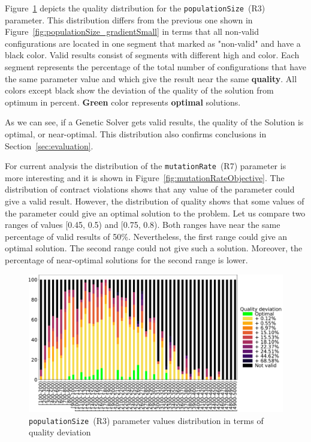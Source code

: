 Figure~\ref{fig:populationSizeObjective} depicts the quality distribution for the \texttt{populationSize}~(R3) parameter. This distribution differs from the previous one shown in Figure~\ref{fig:populationSize_gradientSmall} in terms that all non-valid configurations are located in one segment that marked as "non-valid" and have a black color. Valid results consist of segments with different high and color. Each segment represents the percentage of the total number of configurations that have the same parameter value and which give the result near the same \textbf{quality}. All colors except black show the deviation of the quality of the solution from optimum in percent. \textbf{Green} color represents \textbf{optimal} solutions.

As we can see, if a Genetic Solver gets valid results, the quality of the Solution is optimal, or near-optimal. This distribution also confirms conclusions in Section~\ref{sec:evaluation}.

For current analysis the distribution of the \texttt{mutationRate}~(R7) parameter is more interesting and it is shown in Figure~\ref{fig:mutationRateObjective}. The distribution of contract violations shows that any value of the parameter could give a valid result. However, the distribution of quality shows that some values of the parameter could give an optimal solution to the problem. Let us compare two ranges of values [0.45, 0.5) and [0.75, 0.8). Both ranges have near the same percentage of valid results of 50\%.
Nevertheless, the first range could give an optimal solution. The second range could not give such a solution. Moreover, the percentage of near-optimal solutions for the second range is lower.


\begin{figure}
	\centering
	\includegraphics[width=\textwidth]{images/populationSizeObjective.pdf}
	\caption[\texttt{populationSize}~(R3) parameter values distribution in terms of contract violations] {\texttt{populationSize}~(R3) parameter values distribution in terms of quality deviation}
	\label{fig:populationSizeObjective}
\end{figure}


